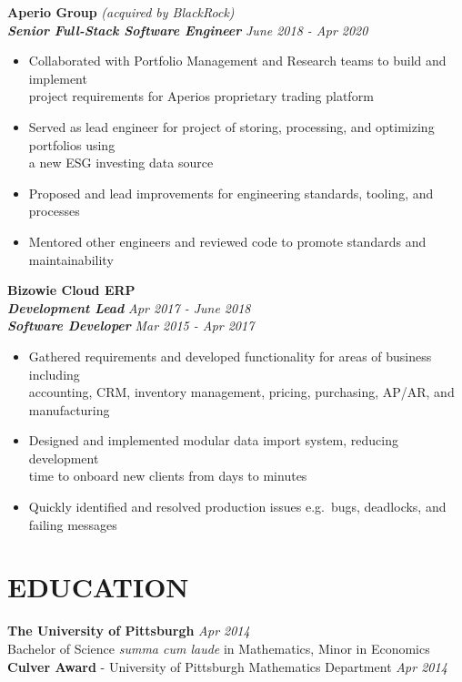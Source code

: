 \documentclass[]{resume}
\newcommand\tab[1][.5cm]{\hspace*{#1}}
\begin{document}
\begin{resume}
\vspace{0.9mm}
\textbf{\large Aperio Group} {\textit{\large(acquired by BlackRock)}}\\
\tab \textbf{\textit{Senior Full-Stack Software Engineer}} \hfill \textit{June 2018 - Apr 2020}
\begin{itemize}
    \item
    Collaborated with Portfolio Management and Research teams to build and implement \\
    project requirements for Aperio\textsc{}s proprietary trading platform
    \item
    Served as lead engineer for project of storing, processing, and optimizing portfolios using \\
    a new ESG investing data source
    \item
    Proposed and lead improvements for engineering standards, tooling, and processes
    \item
    Mentored other engineers and reviewed code to promote standards and maintainability
\end{itemize}


\textbf{\large Bizowie Cloud ERP}\\
\tab\textbf{\textit{Development Lead}} \hfill \textit{Apr 2017 - June 2018}\\
\tab \textbf{\textit{Software Developer}}  \hfill \textit{Mar 2015 - Apr 2017}
\begin{itemize}
    \item
    Gathered requirements and developed functionality for areas of business including \\
    accounting, CRM, inventory management, pricing, purchasing, AP/AR, and manufacturing
    \item
    Designed and implemented modular data import system, reducing development \\
    time to onboard new clients from days to minutes
    \item 
    Quickly identified and resolved production issues e.g.\ bugs, deadlocks, and failing messages
\end{itemize}


\section{EDUCATION\makebox[372 px]{\rule[.5 ex]{372 px}{1.0pt}}}
\vspace{0.9mm}
\textbf{\large The University of Pittsburgh} \hfill \textit{Apr 2014}\vspace{0.7mm}\\ 
\hspace*{4mm}Bachelor of Science \emph{summa cum laude} in Mathematics, Minor in Economics\\ %
\textbf{Culver Award}  - University of Pittsburgh Mathematics Department  \hfill \textit{Apr 2014}\vspace{0.7mm}\clearpage
\end{resume}
\end{document}
